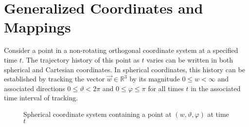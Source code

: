 \documentclass[11pt]{thesis}
\numberwithin{equation}{section}
\begin{document}
\section{Generalized Coordinates and Mappings}
Consider a point in a non-rotating orthogonal coordinate system at a specified time $t$. The trajectory history of this point as $t$ varies can be written in both spherical and Cartesian coordinates. In spherical coordinates, this history can be established by tracking the vector $\vec{w} \in \mathbb{R}^3$ by its magnitude $0 \leq w < \infty$ and associated directions $0 \leq \vartheta < 2\pi$ and $0 \leq \varphi \leq \pi$ for all times $t$ in the associated time interval of tracking.
\begin{figure}[H]
\begin{center}
\end{center}
\caption{Spherical coordinate system containing a point at $(w, \vartheta, \varphi)$ at time $t$}
\label{fig:sph2cart}
\end{figure}
\end{document}
